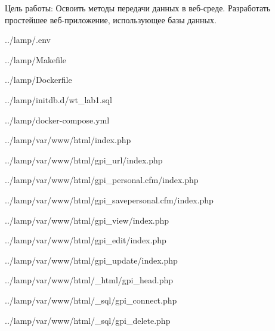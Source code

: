 Цель работы:
Освоить методы передачи данных в веб-среде.
Разработать простейшее веб-приложение, использующее базы данных.


{../lamp/.env}


{../lamp/Makefile}


{../lamp/Dockerfile}


{../lamp/initdb.d/wt_lab1.sql}

\newpage


{../lamp/docker-compose.yml}


{../lamp/var/www/html/index.php}

\newpage


{../lamp/var/www/html/gpi_url/index.php}


{../lamp/var/www/html/gpi_personal.cfm/index.php}


{../lamp/var/www/html/gpi_savepersonal.cfm/index.php}


{../lamp/var/www/html/gpi_view/index.php}


{../lamp/var/www/html/gpi_edit/index.php}


{../lamp/var/www/html/gpi_update/index.php}


{../lamp/var/www/html/_html/gpi_head.php}


{../lamp/var/www/html/_sql/gpi_connect.php}


{../lamp/var/www/html/_sql/gpi_delete.php}
